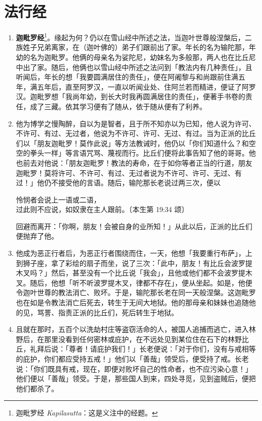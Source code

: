 \section{法行经}

\begin{enumerate}\item \textbf{迦毗罗经}\footnote{迦毗罗经 \textit{Kapilasutta}：这是义注中的经题。}。缘起为何？仍以在雪山经中所述之法，当迦叶世尊般涅槃后，二族姓子兄弟离家，在（迦叶佛的）弟子们跟前出了家。年长的名为输陀那，年幼的名为迦毗罗。他俩的母亲名为娑陀尼，幼妹名为多般那，两人也在比丘尼中出了家。随后，他俩也以雪山经中所述之法问到「教法内有几种责任」，且听闻后，年长的想「我要圆满居住的责任」，便在阿阇黎与和尚跟前住满五年，满五年后，直至阿罗汉，一直以听闻业处、住阿兰若而精进，便证了阿罗汉。迦毗罗想「我尚年幼，到长大时我再圆满居住的责任」，便著手书卷的责任，成了三藏。依其学习便有了随从，依于随从便有了利养。
\item 他为博学之慢陶醉，自以为是智者，且于所不知亦以为已知，他人说为许可、不许可、有过、无过者，他说为不许可、许可、无过、有过。当为正派的比丘们以「朋友迦毗罗！莫作此说」等方法教诫时，他仍以「你们知道什么？和空空的拳头一样」等言语咒骂、蔑视而行。比丘们便将此事告知了他的哥哥。他也前去对他说：「朋友迦毗罗！教法的寿命，在于如你等者正当的行道，朋友迦毗罗！莫将许可、不许可、有过、无过者说为不许可、许可、无过、有过！」他仍不接受他的言语。随后，输陀那长老说过两三次，便以\begin{quoting}怜悯者会说上一语或二语，\\过此则不应说，如奴隶在主人跟前。{\bluefootnotesize 〔本生第 19:34 颂〕}\end{quoting}回避而离开：「你啊，朋友！会被自身的业所知！」从此以后，正派的比丘们便抛弃了他。
\item 他成为恶正行者后，为恶正行者围绕而住，一天，他想「我要重行布萨」，上到狮子座，拿了彩绘的扇子而坐，说了三次：「此中，朋友！有比丘会波罗提木叉吗？」然后，甚至没有一个比丘说「我会」，且他或他们都不会波罗提木叉。随后，他想「听不听波罗提木叉，律都不存在」，便从坐起。如是，他便令迦叶世尊的教法消亡、败坏。于是，输陀那长老在同一天般涅槃。这迦毗罗也在如是令教法消亡后死去，转生于无间大地狱。他的那母亲和妹妹也追随他的见，骂詈、指责正派的比丘们，死后转生于地狱。
\item 且就在那时，五百个以洗劫村庄等盗窃活命的人，被国人追捕而逃亡，进入林野后，在那里没看到任何密林或庇护，在不远处见到某位住在石下的林野比丘，礼拜后说：「尊者！请庇护我们！」长老便说：「对于你们，没有与戒相等的庇护，你们都应受持五戒！」他们以「善哉」领受后，便受持了戒。长老说：「你们既具有戒，现在，即便对败坏自己的性命者，也不应污染心意！」他们便以「善哉」领受。于是，那些国人到来，四处寻觅，见到盗贼后，便把他们都杀了。

\end{enumerate}
